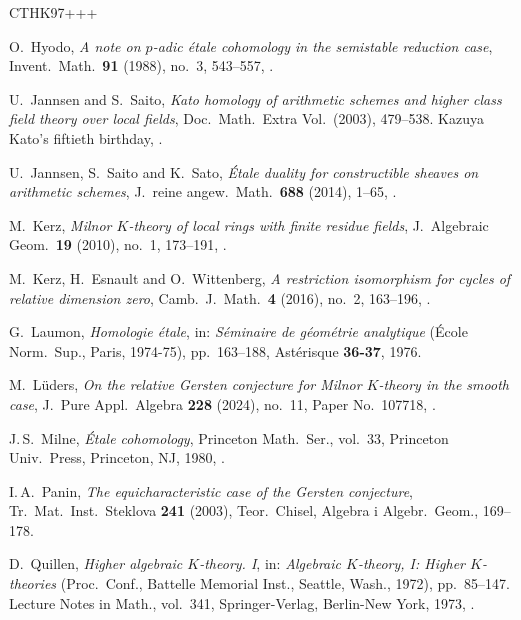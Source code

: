 \documentclass[11pt]{amsart}
\numberwithin{equation}{section}
\newtheorem{Key lemma}[theorem]{Key lemma}
\theoremstyle{definition}
\theoremstyle{remark}
\begin{document}
\begin{thebibliography}{CTHK97+++}
  
O.~Hyodo, \emph{A note on {$p$}-adic \'{e}tale cohomology in the semistable
  reduction case}, Invent.\ Math.\ \textbf{91} (1988), no.~3, 543--557,
  .

U.~Jannsen and S.~Saito, \emph{Kato homology of arithmetic schemes and higher
  class field theory over local fields}, Doc.\ Math.\ Extra Vol.\ (2003), 
  479--538. Kazuya Kato's fiftieth birthday, .

U.~Jannsen, S.~Saito and K.~Sato, \emph{\'{E}tale duality for constructible
  sheaves on arithmetic schemes}, J.~reine angew.\ Math.\ \textbf{688} (2014),
  1--65, .

M.~Kerz, \emph{Milnor {$K$}-theory of local rings with finite residue fields},
  J.~Algebraic Geom.\ \textbf{19} (2010), no.~1, 173--191,
  .

M.~Kerz, H.~Esnault and O.~Wittenberg, \emph{A restriction isomorphism for
  cycles of relative dimension zero}, Camb.~J.\ Math.\ \textbf{4} (2016), no.~2,
  163--196, .

G.~Laumon, \emph{Homologie \'{e}tale}, in: \emph{S\'{e}minaire de g\'{e}om\'{e}trie analytique} (\'{E}cole {N}orm.\ {S}up., {P}aris, 1974-75),  pp.~163--188,  Ast\'{e}risque \textbf{36-37}, 1976.

M.~L{\"u}ders, \emph{On the relative {Gersten} conjecture for {Milnor}
  {{\(K\)}}-theory in the smooth case}, J.~Pure Appl.\ Algebra \textbf{228}
  (2024), no.~11, Paper No.~107718, .

J.\,S.~Milne, \emph{\'Etale cohomology}, Princeton Math.\ Ser., vol.~33,
  Princeton Univ.\ Press, Princeton, NJ, 1980, .

I.\,A.~Panin, \emph{The equicharacteristic case of the {G}ersten conjecture}, Tr.\ Mat.\ Inst.\ Steklova \textbf{241} (2003), Teor.\ Chisel, Algebra i Algebr.\  Geom., 169--178.

D.~Quillen, \emph{Higher algebraic {$K$}-theory. {I}}, in: \emph{Algebraic {$K$}-theory, {I}: {H}igher {$K$}-theories} ({P}roc.\ {C}onf., {B}attelle {M}emorial {I}nst., {S}eattle, {W}ash., 1972), pp.~85--147. Lecture Notes in Math., vol.~341, Springer-Verlag, Berlin-New York, 1973, .


\end{thebibliography}
\end{document}
